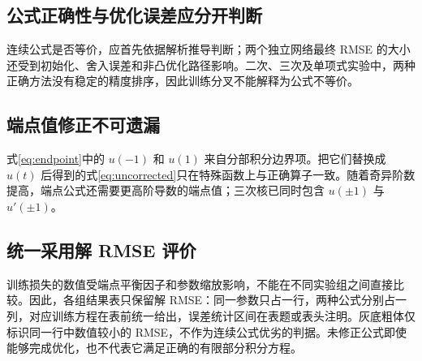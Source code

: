 \documentclass[UTF8,fontset=none,11pt,a4paper]{ctexart}
\begin{document}
\subsection{公式正确性与优化误差应分开判断}

连续公式是否等价，应首先依据解析推导判断；两个独立网络最终 RMSE 的大小还受到初始化、舍入误差和非凸优化路径影响。二次、三次及单项式实验中，两种正确方法没有稳定的精度排序，因此训练分叉不能解释为公式不等价。

\subsection{端点值修正不可遗漏}

式\eqref{eq:endpoint}中的 $u(-1)$ 和 $u(1)$ 来自分部积分边界项。把它们替换成 $u(t)$ 后得到的式\eqref{eq:uncorrected}只在特殊函数上与正确算子一致。随着奇异阶数提高，端点公式还需要更高阶导数的端点值；三次核已同时包含 $u(\pm1)$ 与 $u'(\pm1)$。

\subsection{统一采用解 RMSE 评价}

训练损失的数值受端点平衡因子和参数缩放影响，不能在不同实验组之间直接比较。因此，各组结果表只保留解 RMSE：同一参数只占一行，两种公式分别占一列，对应训练方程在表前统一给出，误差统计区间在表题或表头注明。灰底粗体仅标识同一行中数值较小的 RMSE，不作为连续公式优劣的判据。未修正公式即使能够完成优化，也不代表它满足正确的有限部分积分方程。





\end{document}
